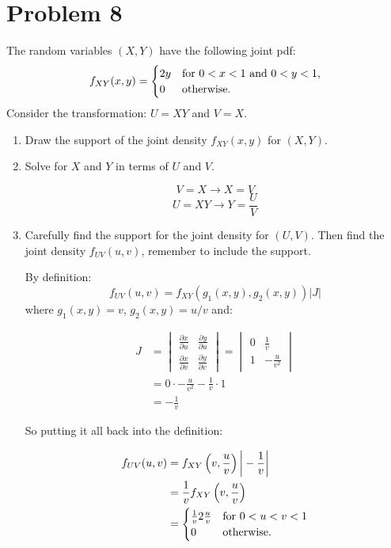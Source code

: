 \documentclass{article}
\newcommand{\1}{\mathbf{1}}
\begin{document}
\newpage
\section*{Problem 8} The random variables $(X,Y)$ have the following joint pdf:
$$f_{XY}(x,y) = \begin{cases}
    2y & \hbox{for } 0 < x < 1 \hbox{ and } 0 < y <1,\\ 
    0 & \hbox{otherwise.}
    \end{cases}
$$
Consider the transformation: $U = XY$ and $ V=X$.

\begin{enumerate}
    \item Draw the support of the joint density $f_{XY}(x,y)$ for $(X,Y)$.

    \item Solve for $X$ and $Y$ in terms of $U$ and $V$.

    $$V=X \rightarrow X=V$$
    $$U=XY \rightarrow Y=\frac{U}{V}$$    
    
    \item Carefully find the support for the joint density for $(U,V)$. Then find the joint density $f_{UV}(u,v)$, remember to include the support.
    
    By definition:
    $$f_{UV}(u,v) = f_{XY}(g_1(x,y), g_2(x,y)) |J|$$
    where $g_1(x,y)=v$, $g_2(x,y)=u/v$ and:
    
    \begin{align*}
    J &= \begin{vmatrix}
        \frac{\partial x}{\partial u} & \frac{\partial y}{\partial u} \\ 
        \frac{\partial x}{\partial v} & \frac{\partial y}{\partial v}
        \end{vmatrix} 
     = \begin{vmatrix}
        0 & \frac{1}{v} \\ 
        1 & -\frac{u}{v^2}
        \end{vmatrix} \\
    &= 0\cdot -\frac{u}{v^2} - \frac{1}{v}\cdot 1 \\
    &= - \frac{1}{v}
    \end{align*}
    
    So putting it all back into the definition:
    
    \begin{align*}
     f_{UV}(u,v) &= f_{XY}\left(v, \frac{u}{v}\right) \bigg|- \frac{1}{v}\bigg| \\
     &= \frac{1}{v} f_{XY}\left(v, \frac{u}{v}\right) \\
     &= \begin{cases}
        \frac{1}{v} 2\frac{u}{v} & \hbox{for } 0 < u < v < 1\\ 
        0 & \hbox{otherwise.}
        \end{cases}
    \end{align*}
    

\end{enumerate}
\end{document}
